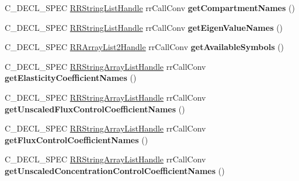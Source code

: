 \begin{DoxyCompactItemize}
\item 
\hypertarget{group__loadsave_gafe31d3b684c51fb829c1770898bc1e5d}{
\-C\-\_\-\-D\-E\-C\-L\-\_\-\-S\-P\-E\-C \hyperlink{struct_r_r_string_list}{\-R\-R\-String\-List\-Handle} \*
rr\-Call\-Conv {\bfseries get\-Compartment\-Names} ()}
\label{group__loadsave_gafe31d3b684c51fb829c1770898bc1e5d}

\item 
\hypertarget{group__loadsave_ga313f81d4fae0ece305eb1246543bcdc3}{
\-C\-\_\-\-D\-E\-C\-L\-\_\-\-S\-P\-E\-C \hyperlink{struct_r_r_string_list}{\-R\-R\-String\-List\-Handle} \*
rr\-Call\-Conv {\bfseries get\-Eigen\-Value\-Names} ()}
\label{group__loadsave_ga313f81d4fae0ece305eb1246543bcdc3}

\item 
\hypertarget{group__loadsave_gaa06a430f57d4df400e58fd954766901c}{
\-C\-\_\-\-D\-E\-C\-L\-\_\-\-S\-P\-E\-C \hyperlink{struct_r_r_array_list2}{\-R\-R\-Array\-List2\-Handle} \*
rr\-Call\-Conv {\bfseries get\-Available\-Symbols} ()}
\label{group__loadsave_gaa06a430f57d4df400e58fd954766901c}

\item 
\hypertarget{group__loadsave_ga35b2d80dfae3ffba81a45a485e30b22e}{
\-C\-\_\-\-D\-E\-C\-L\-\_\-\-S\-P\-E\-C \*
\hyperlink{struct_r_r_string_array_list}{\-R\-R\-String\-Array\-List\-Handle} \*
rr\-Call\-Conv {\bfseries get\-Elasticity\-Coefficient\-Names} ()}
\label{group__loadsave_ga35b2d80dfae3ffba81a45a485e30b22e}

\item 
\hypertarget{group__loadsave_ga9451fdf700b80288c0d664193eef4421}{
\-C\-\_\-\-D\-E\-C\-L\-\_\-\-S\-P\-E\-C \*
\hyperlink{struct_r_r_string_array_list}{\-R\-R\-String\-Array\-List\-Handle} \*
rr\-Call\-Conv {\bfseries get\-Unscaled\-Flux\-Control\-Coefficient\-Names} ()}
\label{group__loadsave_ga9451fdf700b80288c0d664193eef4421}

\item 
\hypertarget{group__loadsave_ga5d72e660bc33c6cbb93aadd603015563}{
\-C\-\_\-\-D\-E\-C\-L\-\_\-\-S\-P\-E\-C \*
\hyperlink{struct_r_r_string_array_list}{\-R\-R\-String\-Array\-List\-Handle} \*
rr\-Call\-Conv {\bfseries get\-Flux\-Control\-Coefficient\-Names} ()}
\label{group__loadsave_ga5d72e660bc33c6cbb93aadd603015563}

\item 
\hypertarget{group__loadsave_ga4cd50e9e57140cb5fd69483bc6b0656e}{
\-C\-\_\-\-D\-E\-C\-L\-\_\-\-S\-P\-E\-C \*
\hyperlink{struct_r_r_string_array_list}{\-R\-R\-String\-Array\-List\-Handle} \*
rr\-Call\-Conv {\bfseries get\-Unscaled\-Concentration\-Control\-Coefficient\-Names} ()}
\label{group__loadsave_ga4cd50e9e57140cb5fd69483bc6b0656e}


\end{DoxyCompactItemize}
